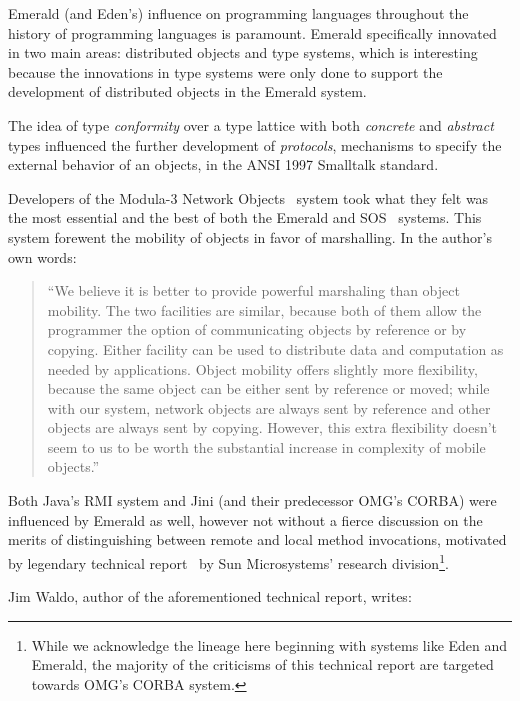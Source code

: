 Emerald (and Eden's) influence on programming languages throughout the history of programming languages is paramount.  Emerald specifically innovated in two main areas: distributed objects and type systems, which is interesting because the innovations in type systems were only done to support the development of distributed objects in the Emerald system.

The idea of type \textit{conformity} over a type lattice with both \textit{concrete} and \textit{abstract} types influenced the further development of \textit{protocols}, mechanisms to specify the external behavior of an objects, in the ANSI 1997 Smalltalk standard.


Developers of the Modula-3 Network Objects~\cite{Birrell:1993:NO:168619.168637} system took what they felt was the most essential and the best of both the Emerald and SOS~\cite{shapiro1989sos} systems.  This system forewent the mobility of objects in favor of marshalling.  In the author's own words:

\begin{quote}
``We believe it is better to provide powerful marshaling than object mobility. The two facilities are similar, because both of them allow the programmer the option of communicating objects by reference or by copying. Either facility can be used to distribute data and computation as needed by applications. Object mobility offers slightly more flexibility, because the same object can be either sent by reference or moved; while with our system, network objects are always sent by reference and other objects are always sent by copying. However, this extra flexibility doesn’t seem to us to be worth the substantial increase in complexity of mobile objects.''~\cite{black2007development}
\end{quote}

Both Java's RMI system and Jini (and their predecessor OMG's CORBA) were influenced by Emerald as well, however not without a fierce discussion on the merits of distinguishing between remote and local method invocations, motivated by legendary technical report~\cite{kendall1994note} by Sun Microsystems' research division\footnote{While we acknowledge the lineage here beginning with systems like Eden and Emerald, the majority of the criticisms of this technical report are targeted towards OMG's CORBA system.}.

Jim Waldo, author of the aforementioned technical report, writes:

